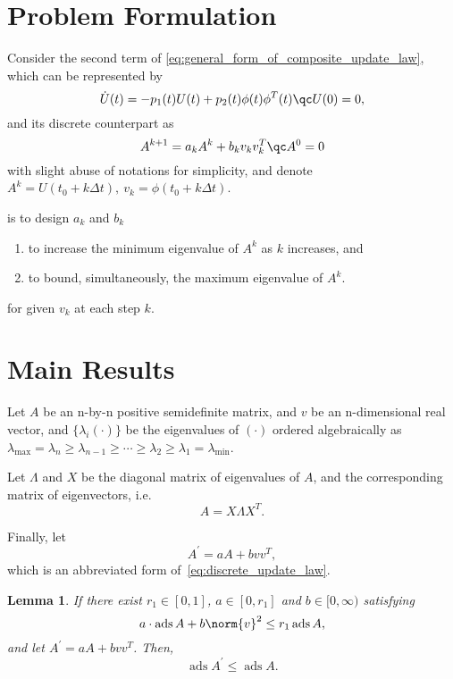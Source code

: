 \documentclass[nobib]{my-handout}
\newtheorem{lemma}{Lemma}
\theoremstyle{definition}
\theoremstyle{remark}
\DeclareMathOperator{\ads}{ads}
\begin{document}
\section{Problem Formulation}

Consider the second term of \eqref{eq:general_form_of_composite_update_law},
which can be represented by
\begin{equation*}
	\dot{U}(t) = - p_1(t) U(t) + p_2(t) \phi(t) \phi^T(t) \qc U(0) = 0,
\end{equation*}
and its discrete counterpart as
\begin{equation}\label{eq:discrete_update_law}
	A^{k+1} = a_k A^k + b_k v_k v_k^T \qc A^0 = 0
\end{equation}
with slight abuse of notations for simplicity, and denote $A^k = U(t_0 + k
\Delta t),\ v_k = \phi(t_0 + k \Delta t)$.

 is to design $a_k$ and $b_k$
\begin{enumerate}
	\item to increase the minimum eigenvalue of $A^k$ as $k$ increases, and
	\item to bound, simultaneously, the maximum eigenvalue of $A^k$.
\end{enumerate}
for given $v_k$ at each step $k$.


\section{Main Results}

Let $A$ be an n-by-n positive semidefinite matrix, and $v$ be an
n-dimensional real vector, and $\{\lambda_i(\cdot)\}$ be the eigenvalues
of $(\cdot)$ ordered algebraically as $\lambda_{\max} = \lambda_n \ge
\lambda_{n-1} \ge \cdots \ge \lambda_2 \ge \lambda_1 = \lambda_{\min}$.

Let $\Lambda$ and $X$ be the diagonal matrix of eigenvalues of $A$, and the
corresponding matrix of eigenvectors, i.e.
\begin{equation*}
	A = X \Lambda X^T.
\end{equation*}

Finally, let
\begin{equation*}
	A^\prime = a A + b v v^T,
\end{equation*}
which is an abbreviated form of~\eqref{eq:discrete_update_law}.

\begin{lemma}\label{lem:shrinking_ads}
	If there exist $r_1 \in [0, 1]$, $a \in [0, r_1]$ and $b \in [0, \infty)$
	satisfying
	\begin{equation*}
		a \cdot \ads{A} + b \norm{v}^2 \le r_1 \ads{A},
	\end{equation*}
	and let $A^\prime = a A + b v v^T$. Then,
	\begin{equation*}
		\ads{A^\prime} \le \ads{A}.
	\end{equation*}
\end{lemma}
\end{document}
